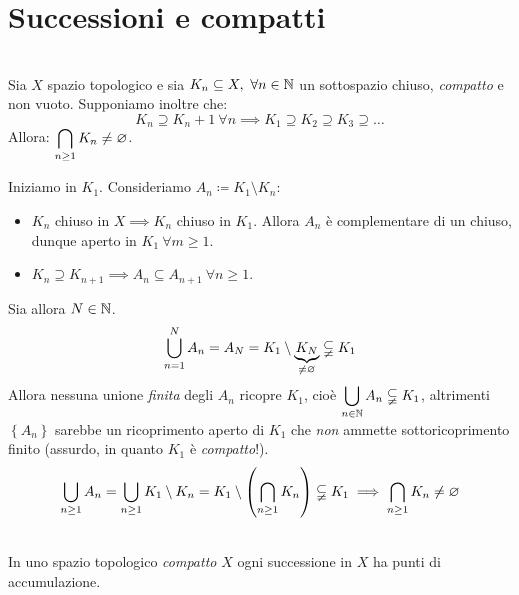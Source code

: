 \section{Successioni e compatti}
\begin{proposition}~{}\label{compattocontenuto}\\
Sia $X$ spazio topologico e sia $K_n\subseteq X,\ \forall n\in\naturalset$ un sottospazio chiuso, \textit{compatto} e non vuoto. Supponiamo inoltre che:
\begin{equation*}
K_n\supseteq K_n+1\ \forall n\implies K_1\supseteq K_2\supseteq K_3\supseteq \ldots
\end{equation*}
Allora: $\displaystyle\mathop{{\bigcap}}\displaylimits_{n\geq 1}K_n\neq\varnothing$.
\end{proposition}
\begin{demonstration}
Iniziamo in $K_1$. Consideriamo $A_n\coloneqq K_1\setminus K_n$:
\begin{itemize}
	\item $K_n$ chiuso in $X\implies K_n$ chiuso in $K_1$. Allora $A_n$ è complementare di un chiuso, dunque aperto in $K_1\ \forall m\geq 1$.
	\item $K_n\supseteq K_{n+1}\implies A_n\subseteq A_{n+1}\ \forall n\geq 1$.
\end{itemize}
Sia allora $N\in\mathbb{N}$.
\begin{equation*}
	\mathop{{\bigcup}}\displaylimits_{n=1}^{N}A_n=A_N=K_1\setminus \underbrace{K_N}_{\neq\varnothing}\subsetneqq K_1
\end{equation*}
Allora nessuna unione \textit{finita} degli $A_n$ ricopre $K_1$, cioè $\displaystyle \mathop{{\bigcup}}\displaylimits_{n\in\mathbb{N}}A_n\subsetneqq K_1$, altrimenti $\left\{A_n\right\}$ sarebbe un ricoprimento aperto di $K_1$ che \textit{non} ammette sottoricoprimento finito (assurdo, in quanto $K_1$ è \textit{compatto}!).
\begin{equation*}
\mathop{{\bigcup}}\displaylimits_{n\geq 1}A_n=\mathop{{\bigcup}}\displaylimits_{n\geq 1}K_1\setminus K_n=K_1\setminus \left(\mathop{{\bigcap}}\displaylimits_{n\geq 1}K_n\right)\subsetneqq K_1\implies \mathop{{\bigcap}}\displaylimits_{n\geq 1}K_n\neq\varnothing
\end{equation*}
\vspace{-6mm}
\end{demonstration}
\begin{lemming}~{}\\
In uno spazio topologico \textit{compatto} $X$ ogni successione in $X$ ha punti di accumulazione.
\end{lemming}
